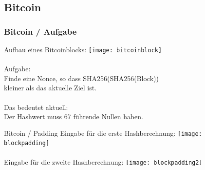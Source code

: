 \documentclass{beamer}
\begin{document}
  \subsection{Bitcoin}
    \begin{frame}
      \frametitle{Bitcoin / Aufgabe}
      Aufbau eines Bitcoinblocks:
      \texttt{[image: bitcoinblock]}\\
      ~\\
      Aufgabe:\\
      Finde eine Nonce, so dass SHA256(SHA256(Block))\\
      kleiner als das aktuelle Ziel ist.\\
      ~\\
      Das bedeutet aktuell:\\
      Der Hashwert muss 67 führende Nullen haben.
    \end{frame}
    \begin{frame}{Bitcoin / Padding}
      Eingabe für die erste Hashberechnung:
      \texttt{[image: blockpadding]}\\
      ~\\
      Eingabe für die zweite Hashberechnung:
      \texttt{[image: blockpadding2]}\\
  \end{frame}
\end{document}
